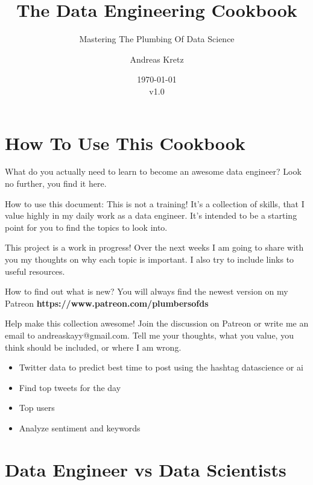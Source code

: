 \documentclass[12pt]{scrartcl} %
\title{The Data Engineering Cookbook}
\subtitle{Mastering The Plumbing Of Data Science}
\author{Andreas Kretz}
\date{\today\\v1.0}
\begin{document}
\maketitle


\pagebreak

\setcounter{tocdepth}{3}
\tableofcontents

\pagebreak

\section{How To Use This Cookbook}
What do you actually need to learn to become an awesome data engineer?
Look no further, you find it here.

How to use this document: This is not a training! It's a collection of skills, that I value highly in my daily work as a data engineer. It's intended to be a starting point for you to find the topics to look into.

This project is a work in progress!
Over the next weeks I am going to share with you my thoughts on why each topic is important. I also try to include links to useful resources.

How to find out what is new?
You will always find the newest version on my Patreon \textbf{https://www.patreon.com/plumbersofds}

Help make this collection awesome!
Join the discussion on Patreon or write me an email to andreaskayy@gmail.com. Tell me your thoughts, what you value, you think should be included, or where I am wrong.

\begin{itemize}
\item Twitter data to predict best time to post using the hashtag datascience or ai
\item Find top tweets for the day
\item Top users
\item Analyze sentiment and keywords
\end{itemize}

\pagebreak

\section{Data Engineer vs Data Scientists}
\end{document}
